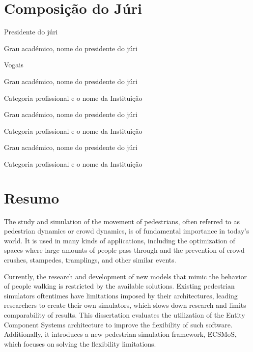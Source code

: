 \documentclass[twoside, 11pt]{article}
\begin{document}
 
\blankpage
\newpage

\section*{Composição do Júri}

\noindent Presidente do júri

Grau académico, nome do presidente do júri

\noindent Vogais

Grau académico, nome do presidente do júri

Categoria profissional e o nome da Instituição

\vspace{1cm}

Grau académico, nome do presidente do júri

Categoria profissional e o nome da Instituição

\vspace{1cm}

Grau académico, nome do presidente do júri

Categoria profissional e o nome da Instituição

\clearpage            %
\null                %
\newpage             %

\section*{Resumo}

The study and simulation of the movement of pedestrians, often referred to as pedestrian dynamics or crowd dynamics, is of fundamental importance in today's world. It is used in many kinds of applications, including the optimization of spaces where large amounts of people pass through and the prevention of crowd crushes, stampedes, tramplings, and other similar events.

Currently, the research and development of new models that mimic the behavior of people walking is restricted by the available solutions. Existing pedestrian simulators oftentimes have limitations imposed by their architectures, leading researchers to create their own simulators, which slows down research and limits comparability of results. This dissertation evaluates the utilization of the Entity Component Systems architecture to improve the flexibility of such software. Additionally, it introduces a new pedestrian simulation framework, ECSMoS, which focuses on solving the flexibility limitations.
\end{document}
